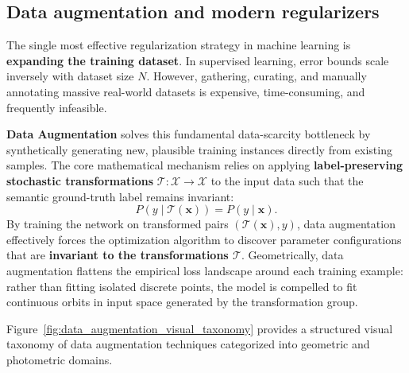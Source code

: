 \subsection{Data augmentation and modern regularizers}
\label{sec:data_augmentation_modern}

The single most effective regularization strategy in machine learning is \textbf{expanding the training dataset}. In supervised learning, error bounds scale inversely with dataset size $N$. However, gathering, curating, and manually annotating massive real-world datasets is expensive, time-consuming, and frequently infeasible.

\textbf{Data Augmentation} solves this fundamental data-scarcity bottleneck by synthetically generating new, plausible training instances directly from existing samples. The core mathematical mechanism relies on applying \textbf{label-preserving stochastic transformations} $\mathcal{T}: \mathcal{X} \to \mathcal{X}$ to the input data such that the semantic ground-truth label remains invariant:
\begin{equation}
P(y \mid \mathcal{T}(\mathbf{x})) = P(y \mid \mathbf{x}).
\label{eq:label_preservation_property}
\end{equation}
By training the network on transformed pairs $(\mathcal{T}(\mathbf{x}), y)$, data augmentation effectively forces the optimization algorithm to discover parameter configurations that are \textbf{invariant to the transformations $\mathcal{T}$}. Geometrically, data augmentation flattens the empirical loss landscape around each training example: rather than fitting isolated discrete points, the model is compelled to fit continuous orbits in input space generated by the transformation group.

Figure~\ref{fig:data_augmentation_visual_taxonomy} provides a structured visual taxonomy of data augmentation techniques categorized into geometric and photometric domains.

